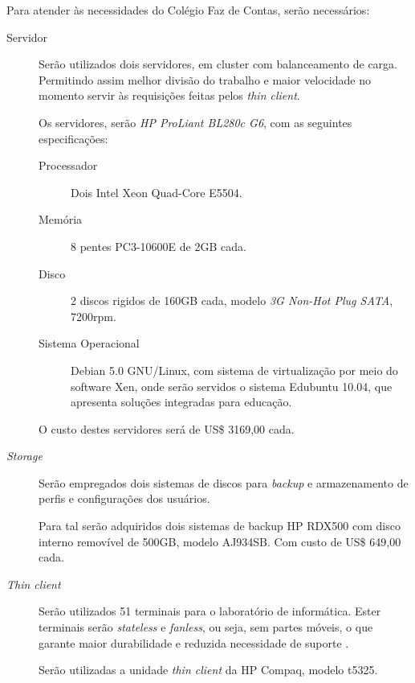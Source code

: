         Para atender às necessidades do Colégio Faz de Contas, serão
        necessários:

        \begin{description}

            \item[Servidor] Serão utilizados dois servidores, em cluster
            com balanceamento de carga. Permitindo assim melhor divisão do
            trabalho e maior velocidade no momento servir às requisições
            feitas pelos \emph{thin client}.

            Os servidores, serão \emph{HP ProLiant BL280c G6}, com as
            seguintes especificações:

            \begin{description}

                \item[Processador] Dois Intel Xeon Quad-Core E5504.

                \item[Memória] 8 pentes PC3-10600E de 2GB cada.

                \item[Disco] 2 discos rigidos de 160GB cada, modelo
                \emph{3G Non-Hot Plug SATA}, 7200rpm.

                \item[Sistema Operacional] Debian 5.0 GNU/Linux, com sistema
                de virtualização por meio do software Xen, onde serão
                servidos o sistema Edubuntu 10.04, que apresenta soluções
                integradas para educação.

            \end{description}

            O custo destes servidores será de US\$ 3169,00 cada.

            \item[\emph{Storage}] Serão empregados dois sistemas de discos
            para \emph{backup} e armazenamento de perfis e configurações
            dos usuários.

            Para tal serão adquiridos dois sistemas de backup HP RDX500
            com disco interno removível de 500GB, modelo AJ934SB. Com custo
            de US\$ 649,00 cada.

            \item[\emph{Thin client}] Serão utilizados 51 terminais
            para o laboratório de
            informática. Ester terminais serão \emph{stateless} e
            \emph{fanless}, ou seja, sem partes móveis, o que garante maior
            durabilidade e reduzida necessidade de suporte \cite{richards:2007}.

            Serão utilizadas a unidade \emph{thin client} da HP Compaq,
            modelo t5325.

        \end{description}

